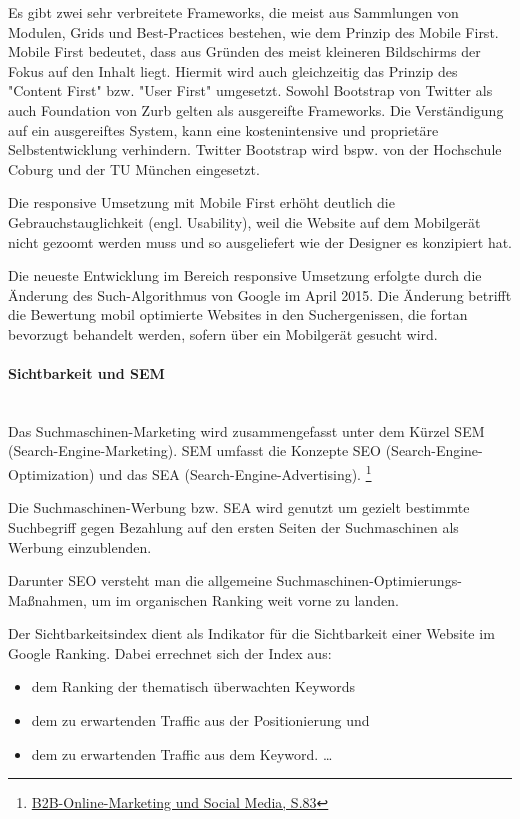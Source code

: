\documentclass[a4paper, 12pt]{scrreprt}
\begin{document}
Es gibt zwei sehr verbreitete Frameworks, die meist aus Sammlungen von Modulen, Grids und Best-Practices bestehen, wie dem Prinzip des Mobile First. Mobile First bedeutet, dass aus Gründen des meist kleineren Bildschirms der Fokus auf den Inhalt liegt. Hiermit wird auch gleichzeitig das Prinzip des "Content First" bzw. "User First" umgesetzt. Sowohl Bootstrap von Twitter als auch Foundation von Zurb gelten als ausgereifte Frameworks. Die Verständigung auf ein ausgereiftes System, kann eine kostenintensive und proprietäre Selbstentwicklung verhindern. Twitter Bootstrap wird bspw. von der Hochschule Coburg und der TU München eingesetzt.

Die responsive Umsetzung mit Mobile First erhöht deutlich die Gebrauchstauglichkeit (engl. Usability), weil die Website auf dem Mobilgerät nicht gezoomt werden muss und so ausgeliefert wie der Designer es konzipiert hat. 

Die neueste Entwicklung im Bereich responsive Umsetzung erfolgte durch die Änderung des Such-Algorithmus von Google im April 2015. Die Änderung betrifft die Bewertung mobil optimierte Websites in den Suchergenissen, die fortan bevorzugt behandelt werden, sofern über ein Mobilgerät gesucht wird.

\paragraph{Sichtbarkeit und SEM}\mbox{}\\ %
Das Suchmaschinen-Marketing wird zusammengefasst unter dem Kürzel SEM (Search-Engine-Marketing). SEM umfasst die Konzepte SEO (Search-Engine-Optimization) und das SEA (Search-Engine-Advertising). \footnote{\url{B2B-Online-Marketing und Social Media, S.83}}

Die Suchmaschinen-Werbung bzw. SEA wird genutzt um gezielt bestimmte Suchbegriff gegen Bezahlung auf den ersten Seiten der Suchmaschinen als Werbung einzublenden.

Darunter SEO versteht man die allgemeine Suchmaschinen-Optimierungs-Maßnahmen, um im organischen Ranking weit vorne zu landen.

Der Sichtbarkeitsindex dient als Indikator für die Sichtbarkeit einer Website im Google Ranking. Dabei errechnet sich der Index aus:


\begin{itemize}
  \item dem Ranking der thematisch überwachten Keywords
  \item dem zu erwartenden Traffic aus der Positionierung und
  \item dem zu erwartenden Traffic aus dem Keyword. \ldots
\end{itemize}
\end{document}
